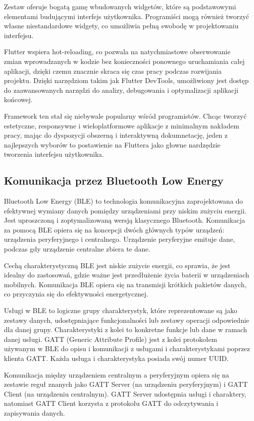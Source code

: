 \documentclass[12pt,twoside]{article}
\begin{document}
Zestaw oferuje bogatą gamę wbudowanych widgetów, które są podstawowymi elementami budującymi interfejs użytkownika. Programiści mogą również tworzyć własne niestandardowe widgety, co umożliwia pełną swobodę w projektowaniu interfejsu.

Flutter wspiera hot-reloading, co pozwala na natychmiastowe obserwowanie zmian wprowadzanych w kodzie bez konieczności ponownego uruchamiania całej aplikacji, dzięki czemu znacznie skraca się czas pracy podczas rozwijania projektu.
Dzięki narzędziom takim jak Flutter DevTools, umożliwiony jest dostęp do zaawansowanych narzędzi do analizy, debugowania i optymalizacji aplikacji końcowej.\cite{flutterDocs}

Framework ten stał się niebywale popularny wśród programistów. Chcąc tworzyć estetyczne, responsywne i wieloplatformowe aplikacje z minimalnym nakładem pracy, mając do dyspozycji obszerną i interaktywną dokumnetację, jeden z najlepszych wyborów to postawienie na Fluttera jako głowne nardzędzie tworzenia interfejsu użytkownika.
\subsection{Komunikacja przez Bluetooth Low Energy}
Bluetooth Low Energy (BLE) to technologia komunikacyjna zaprojektowana do efektywnej wymiany danych pomiędzy urządzeniami przy niskim zużyciu energii. Jest uproszczoną i zoptymalizowaną wersją klasycznego Bluetooth.
Komunikacja za pomocą BLE opiera się na koncepcji dwóch głównych typów urządzeń: urządzenia peryferyjnego i centralnego. Urządzenie peryferyjne emituje dane, podczas gdy urządzenie centralne zbiera te dane.

Cechą charakterystyczną BLE jest niskie zużycie energii, co sprawia, że jest idealny do zastosowań, gdzie ważne jest przedłużenie życia baterii w urządzeniach mobilnych.
Komunikacja BLE opiera się na transmisji krótkich pakietów danych, co przyczynia się do efektywności energetycznej.

Usługi w BLE to logiczne grupy charakterystyk, które reprezentowane są jako zestawy danych, udostępniające funkcjonalności lub zestawy operacji odpowiednie dla danej grupy. Charakterystyki z kolei to konkretne funkcje lub dane w ramach danej usługi. GATT (Generic Attribute Profile) jest z kolei protokołem używanym w BLE do opisu i komunikacji z usługami i charakterystykami poprzez klienta GATT. Każda usługa i charakterystyka posiada swój numer UUID.

Komunikacja między urządzeniem centralnym a peryferyjnym opiera się na zestawie reguł znanych jako GATT Server (na urządzeniu peryferyjnym) i GATT Client (na urządzeniu centralnym). GATT Server udostępnia usługi i charaktery, natomiast GATT Client korzysta z protokołu GATT do odczytywania i zapisywania danych.
\end{document}
